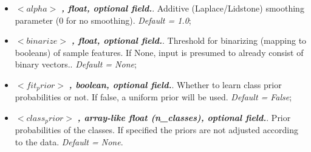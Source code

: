 \begin{itemize}
\item $<alpha>$ \textbf{\textit{, float, optional field.}}.  Additive (Laplace/Lidstone) smoothing parameter (0 for no smoothing). \textit{Default = 1.0};
\item $<binarize>$ \textbf{\textit{, float, optional field.}}.  Threshold for binarizing (mapping to booleans) of sample features. If None, input is presumed to already consist of binary vectors.. \textit{Default = None};
\item $<fit_prior>$ \textbf{\textit{, boolean, optional field.}}.  Whether to learn class prior probabilities or not. If false, a uniform prior will be used. \textit{Default = False};
\item $<class_prior>$ \textbf{\textit{, array-like float (n\_classes), optional field.}}.  Prior probabilities of the classes. If specified the priors are not adjusted according to the data. \textit{Default = None}.
\end{itemize}
